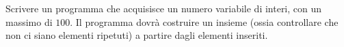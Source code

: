 \begin{Exercise}[label={ex:set}]
  Scrivere un programma che acquisisce un numero variabile di interi, con un massimo di $100$. Il programma dovr\`a costruire un insieme (ossia controllare che non ci siano elementi ripetuti) a partire dagli elementi inseriti.
\end{Exercise}

\begin{Answer}[ref={ex:set}]
  
\end{Answer}
